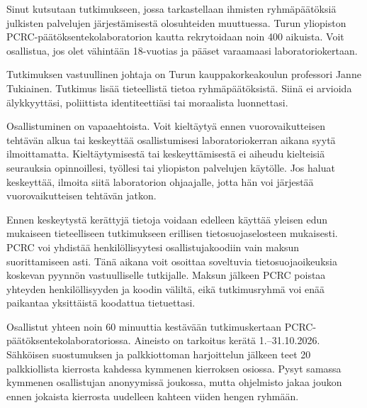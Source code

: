
\renewcommand{\StudyTitle}{\StudyTitleFI}
\setlength{\emergencystretch}{2em}


Sinut kutsutaan tutkimukseen, jossa tarkastellaan ihmisten ryhmäpäätöksiä julkisten palvelujen järjestämisestä olosuhteiden muuttuessa. Turun yliopiston PCRC-päätöksentekolaboratorion kautta rekrytoidaan noin 400 aikuista. Voit osallistua, jos olet vähintään 18-vuotias ja pääset varaamaasi laboratoriokertaan.

Tutkimuksen vastuullinen johtaja on Turun kauppakorkeakoulun professori Janne Tukiainen. Tutkimus lisää tieteellistä tietoa ryhmäpäätöksistä. Siinä ei arvioida älykkyyttäsi, poliittista identiteettiäsi tai moraalista luonnettasi.

Osallistuminen on vapaaehtoista. Voit kieltäytyä ennen vuorovaikutteisen tehtävän alkua tai keskeyttää osallistumisesi laboratoriokerran aikana syytä ilmoittamatta. Kieltäytymisestä tai keskeyttämisestä ei aiheudu kielteisiä seurauksia opinnoillesi, työllesi tai yliopiston palvelujen käytölle. Jos haluat keskeyttää, ilmoita siitä laboratorion ohjaajalle, jotta hän voi järjestää vuorovaikutteisen tehtävän jatkon.

Ennen keskeytystä kerättyjä tietoja voidaan edelleen käyttää yleisen edun mukaiseen tieteelliseen tutkimukseen erillisen tietosuojaselosteen mukaisesti. PCRC voi yhdistää henkilöllisyytesi osallistujakoodiin vain maksun suorittamiseen asti. Tänä aikana voit osoittaa soveltuvia tietosuojaoikeuksia koskevan pyynnön vastuulliselle tutkijalle. Maksun jälkeen PCRC poistaa yhteyden henkilöllisyyden ja koodin väliltä, eikä tutkimusryhmä voi enää paikantaa yksittäistä koodattua tietuettasi.

Osallistut yhteen noin 60 minuuttia kestävään tutkimuskertaan PCRC-päätöksentekolaboratoriossa. Aineisto on tarkoitus kerätä 1.--31.10.2026. Sähköisen suostumuksen ja palkkiottoman harjoittelun jälkeen teet 20 palkkiollista kierrosta kahdessa kymmenen kierroksen osiossa. Pysyt samassa kymmenen osallistujan anonyymissä joukossa, mutta ohjelmisto jakaa joukon ennen jokaista kierrosta uudelleen kahteen viiden hengen ryhmään.


